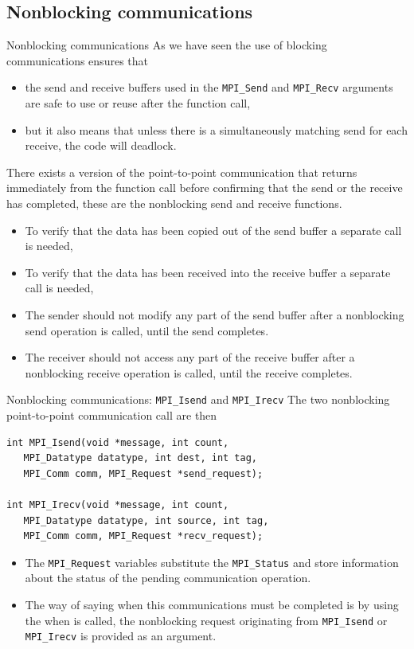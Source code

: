 \documentclass[xcolor={svgnames,usenames}]{beamer}
\begin{document}
\subsection{Nonblocking communications}
\begin{frame}{Nonblocking communications}
As we have seen the use of blocking communications ensures that
\begin{itemize} 
	\item the send and receive buffers used in the \texttt{MPI_Send} and \texttt{MPI_Recv}
arguments are safe to use or reuse after the function call, 
	\item but it also means that unless there is a simultaneously matching send for each receive, the code will deadlock.
\end{itemize}

There exists a version of the point-to-point communication that \alert{returns immediately} from the function call before
confirming that the send or the receive has completed, these are the nonblocking send and receive functions.
\begin{itemize}
	\item<2-> To verify that the data has been copied out of the send
	buffer a separate call is needed,
	\item<2-> To verify that the data has been received into the receive buffer a separate call is needed,
	\item<3-> The sender should not modify any part of the send buffer after a nonblocking
	send operation is called, until the send completes.
	\item<3-> The receiver should not access any part of the receive buffer after a nonblocking
	receive operation is called, until the receive completes.
\end{itemize}
\end{frame}

\begin{frame}[fragile]{Nonblocking communications: \texttt{MPI_Isend} and \texttt{MPI_Irecv}}
The two nonblocking point-to-point communication call are then
\begin{verbatim}
int MPI_Isend(void *message, int count, 
   MPI_Datatype datatype, int dest, int tag,
   MPI_Comm comm, MPI_Request *send_request);

int MPI_Irecv(void *message, int count, 
   MPI_Datatype datatype, int source, int tag,
   MPI_Comm comm, MPI_Request *recv_request);
\end{verbatim}
\begin{itemize}
	\item The \texttt{MPI_Request} variables substitute the \texttt{MPI_Status} and store information about the status of the pending communication operation.
	\item The way of saying when this communications \alert{must} be completed is by using the 
	when is called, the nonblocking request originating from \texttt{MPI_Isend} or \texttt{MPI_Irecv} is provided as an argument.
\end{itemize}
\end{frame}
\end{document}
